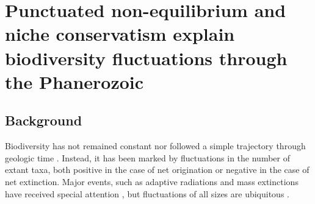 \chapter{Punctuated non-equilibrium and niche conservatism explain
  biodiversity fluctuations through the Phanerozoic}




\section{Background}
Biodiversity has not remained constant nor followed a simple
trajectory through geologic time \cite{raup1982, sepkoski1984,
  gilinsky1994, liow2007, alroy08, alroy2010}.  Instead, it has been
marked by fluctuations in the number of extant taxa, both positive in
the case of net origination or negative in the case of net
extinction. Major events, such as adaptive radiations and mass
extinctions have received special attention \citep{benton1995,
  Erwin1998}, but fluctuations of all sizes are ubiquitous
\citep{sepkoski1984, alroy08, quental2013}.

